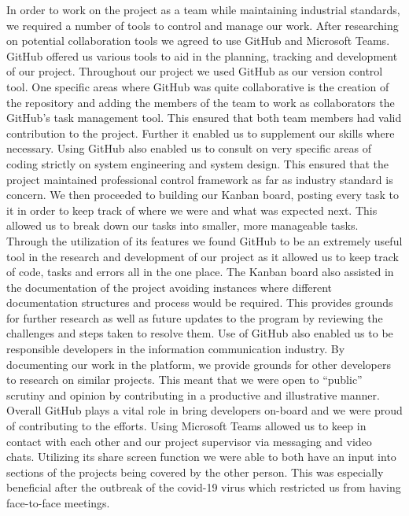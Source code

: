 In order to work on the project as a team while maintaining industrial standards, we required a number of tools to control and manage our work. After researching on potential collaboration tools we agreed to use GitHub and Microsoft Teams. GitHub offered us various tools to aid in the planning, tracking and development of our project. Throughout our project we used GitHub as our version control tool. 
\newline
\newline
One specific areas where GitHub was quite collaborative is the creation of the repository and adding the members of the team to work as collaborators the GitHub’s task management tool. This ensured that both team members had valid contribution to the project. Further it enabled us to supplement our skills where necessary. Using GitHub also enabled us to consult on very specific areas of coding strictly on system engineering and system design. This ensured that the project maintained professional control framework as far as industry standard is concern.  
\newline
\newline
We then proceeded to building our Kanban board, posting every task to it in order to keep track of where we were and what was expected next. This allowed us to break down our tasks into smaller, more manageable tasks. Through the utilization of its features we found GitHub to be an extremely useful tool in the research and development of our project as it allowed us to keep track of code, tasks and errors all in the one place. The Kanban board also assisted in the documentation of the project avoiding instances where different documentation structures and process would be required. This provides grounds for further research as well as future updates to the program by reviewing the challenges and steps taken to resolve them. 
\newline
\newline
Use of GitHub also enabled us to be responsible developers in the information communication industry. By documenting our work in the platform, we provide grounds for other developers to research on similar projects. This meant that we were open to “public” scrutiny and opinion by contributing in a productive and illustrative manner. Overall GitHub plays a vital role in bring developers on-board and we were proud of contributing to the efforts. 
Using Microsoft Teams allowed us to keep in contact with each other and our project supervisor via messaging and video chats. Utilizing its share screen function we were able to both have an input into sections of the projects being covered by the other person. This was especially beneficial after the outbreak of the covid-19 virus which restricted us from having face-to-face meetings.


